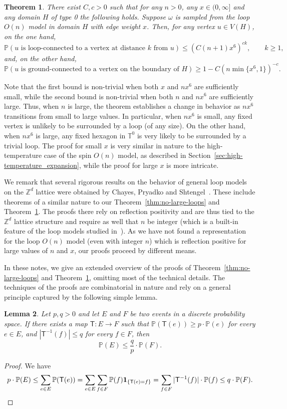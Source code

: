 \documentclass[12pt,reqno]{article}
\def\Z{\mathbb{Z}}
\newtheorem{theorem}{Theorem}[section]
\newtheorem{lemma}[theorem]{Lemma}
\renewcommand{\Pr}{\mathbb{P}}
\newcommand{\sfT}{\mathsf{T}}
\begin{document}
\begin{theorem}\label{thm:large-n-transition}
    There exist $C,c>0$ such that for any $n>0$, any $x\in(0,\infty]$ and any domain $H$ of type 0 the following holds. Suppose $\omega$ is sampled from the loop $O(n)$ model in domain $H$ with edge weight $x$.
    Then, for any vertex $u \in V(H)$, on the one hand,
    \[ \Pr(\text{$u$ is loop-connected to a vertex at distance $k$ from $u$}) \le (C (n+1) x^6)^{ck} , \qquad k \ge 1, \]
    and, on the other hand,
    \[ \Pr(\text{$u$ is ground-connected to a vertex on the boundary of }H) \ge 1 - C(n \min\{x^6,1\})^{-c} .\]
\end{theorem}

Note that the first bound is non-trivial when both $x$ and $nx^6$ are sufficiently small, while the second bound is non-trivial when both $n$ and $nx^6$ are sufficiently large.
Thus, when $n$ is large, the theorem establishes a change in behavior as $nx^6$ transitions from small to large values.
In particular, when $nx^6$ is small, any fixed vertex is unlikely to be surrounded by a loop (of any size). On the other hand, when $nx^6$ is large, any fixed hexagon in $\mathbb{T}^0$ is very likely to be surrounded by a trivial loop.
The proof for small $x$ is very similar in nature to the high-temperature case of the spin $O(n)$ model, as described in Section~\ref{sec:high-temperature_expansion}, while the proof for large $x$ is more intricate.

\medbreak
We remark that several rigorous results on the behavior of general loop models on the $\Z^d$ lattice were obtained by Chayes, Pryadko and Shtengel~\cite{chayes2000intersecting}. These include theorems of a similar nature to our Theorem~\ref{thm:no-large-loops} and Theorem~\ref{thm:large-n-transition}. The proofs there rely on reflection positivity and are thus tied to the $\Z^d$ lattice structure and require as well that $n$ be integer (which is a built-in feature of the loop models studied in~\cite{chayes2000intersecting}). As we have not found a representation for the loop $O(n)$ model (even with integer $n$) which is reflection positive for large values of $n$ and $x$, our proofs proceed by different means.
\medbreak

In these notes, we give an extended overview of the proofs of Theorem~\ref{thm:no-large-loops} and Theorem~\ref{thm:large-n-transition}, omitting most of the technical details.
The techniques of the proofs are combinatorial in nature and rely on a general principle captured by the following simple lemma.
\begin{lemma}
    \label{lem:prob-inequality-tool}
    Let $p,q>0$ and let $E$ and $F$ be two events in a discrete probability space. If there exists a map $\sfT \colon E \to F$ such that $\Pr(\sfT(e))\ge p\cdot\Pr(e)$ for every $e\in E$, and $|\sfT^{-1}(f)|\le q$ for every $f\in F$, then
    \[ \Pr(E) \leq \frac{q}{p}\cdot\Pr(F) .\]
\end{lemma}
\begin{proof}
    We have
    \[ p\cdot \Pr(E)  \leq \sum_{e \in E} \Pr(\sfT(e))
    = \sum_{e \in E} \sum_{f \in F} \Pr(f) \mathbf{1}_{\{\sfT(e)=f\}}
    = \sum_{f \in F} |\sfT^{-1}(f)|\cdot\Pr(f) \leq q\cdot \Pr(F). \qedhere \]
\end{proof}
\end{document}
